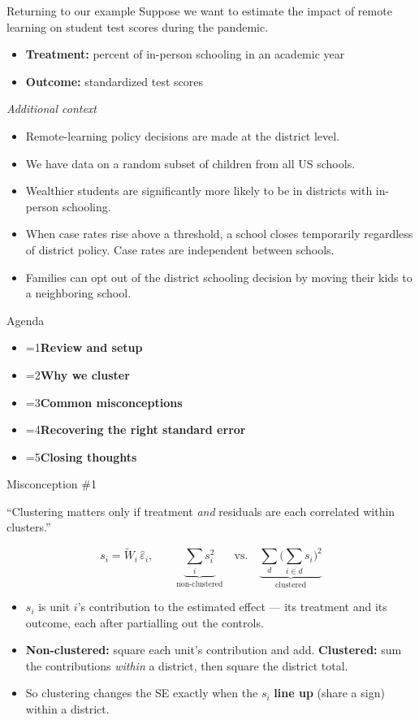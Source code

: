 \documentclass[11pt,aspectratio=169]{beamer}
\newcommand{\bx}[1]{\textbf{#1}}
\newcounter{agcur}
\newcommand{\agitem}[2]{\item {\ifnum\value{agcur}=#1\bfseries\fi #2}}
\newcommand{\agenda}[1]{%
  \setcounter{agcur}{#1}%
  \begin{frame}{Agenda}
    \vspace{0.6em}
    \large
    \begin{itemize}\setlength{\itemsep}{11pt}
      \agitem{1}{Review and setup}
      \agitem{2}{Why we cluster}
      \agitem{3}{Common misconceptions}
      \agitem{4}{Recovering the right standard error}
      \agitem{5}{Closing thoughts}
    \end{itemize}
  \end{frame}}
\begin{document}
\begin{frame}{Returning to our example}
\small
Suppose we want to estimate the impact of remote learning on student test scores during the pandemic.
\begin{itemize}\setlength{\itemsep}{3pt}
  \item \bx{Treatment:} percent of in-person schooling in an academic year
  \item \bx{Outcome:} standardized test scores
\end{itemize}
\vspace{4pt}
\textit{Additional context}
\begin{itemize}\setlength{\itemsep}{3pt}
  \item<2-> Remote-learning policy decisions are made at the district level.
  \item<3-> We have data on a random subset of children from all US schools.
  \item<4-> Wealthier students are significantly more likely to be in districts with in-person schooling.
  \item<5-> When case rates rise above a threshold, a school closes temporarily regardless of district policy.
        Case rates are independent between schools.
  \item<6-> Families can opt out of the district schooling decision by moving their kids to a neighboring school.
\end{itemize}
\end{frame}

\agenda{3}

\begin{frame}{Misconception \#1}
\begin{block}{\normalsize ``Clustering matters only if treatment \emph{and} residuals are each correlated within clusters.''}
\end{block}
\[
  s_i = \tilde W_i\,\hat\varepsilon_i,
  \qquad
  \underbrace{\textstyle\sum_i s_i^2}_{\text{non-clustered}}
  \quad\text{vs.}\quad
  \underbrace{\textstyle\sum_d \Big(\sum_{i\in d} s_i\Big)^2}_{\text{clustered}}
\]
\begin{itemize}\setlength{\itemsep}{9pt}
  \item $s_i$ is unit $i$'s contribution to the estimated effect --- its treatment and its outcome, each after
        partialling out the controls.
  \item \bx{Non-clustered:} square each unit's contribution and add. \bx{Clustered:} sum the contributions
        \emph{within} a district, then square the district total.
  \item So clustering changes the SE exactly when the $s_i$ \bx{line up} (share a sign) within a district.
\end{itemize}
\end{frame}
\end{document}
